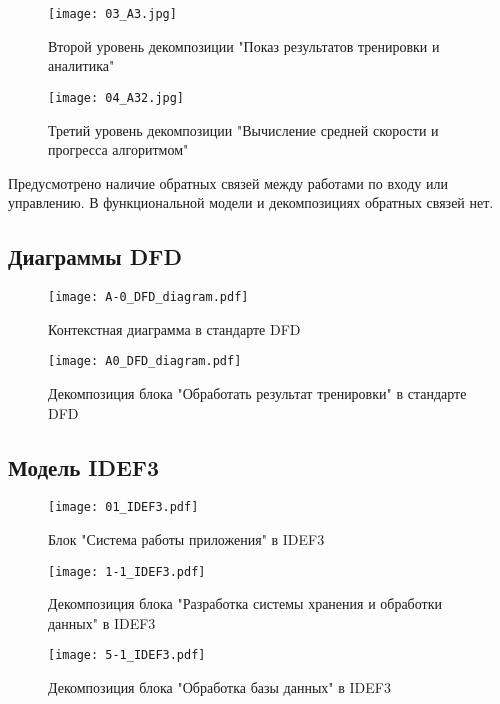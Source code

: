 \documentclass[14pt]{extreport}
\begin{document}
\begin{figure}[H]
\centerline{\texttt{[image: 03\_A3.jpg]}}
\caption{Второй уровень декомпозиции "Показ результатов тренировки и аналитика"}
\label{fig13}
\end{figure}

\begin{figure}[H]
\centerline{\texttt{[image: 04\_A32.jpg]}}
\caption{Третий уровень декомпозиции "Вычисление средней скорости и прогресса алгоритмом"}
\label{fig14}
\end{figure}

Предусмотрено наличие обратных связей между работами по входу или управлению. В функциональной модели и декомпозициях обратных связей нет.

\begin{landscape}

\subsection{Диаграммы DFD}
\begin{figure}[H]
\centerline{\texttt{[image: A-0\_DFD\_diagram.pdf]}}
\caption{Контекстная диаграмма в стандарте DFD}
\label{fig11}
\end{figure}

\begin{figure}[H]
\centerline{\texttt{[image: A0\_DFD\_diagram.pdf]}}
\caption{Декомпозиция блока "Обработать результат тренировки"{} в стандарте DFD}
\label{fig12}
\end{figure}

\subsection{Модель IDEF3}

\begin{figure}[H]
\centerline{\texttt{[image: 01\_IDEF3.pdf]}}
\caption{Блок "Система работы приложения"{} в IDEF3}
\label{fig13}
\end{figure}

\begin{figure}[H]
\centerline{\texttt{[image: 1-1\_IDEF3.pdf]}}
\caption{Декомпозиция блока "Разработка системы хранения и обработки данных"{} в IDEF3}
\label{fig14}
\end{figure}

\begin{figure}[H]
\centerline{\texttt{[image: 5-1\_IDEF3.pdf]}}
\caption{Декомпозиция блока "Обработка базы данных"{} в IDEF3}
\label{fig15}
\end{figure}

\end{landscape}
\end{document}
